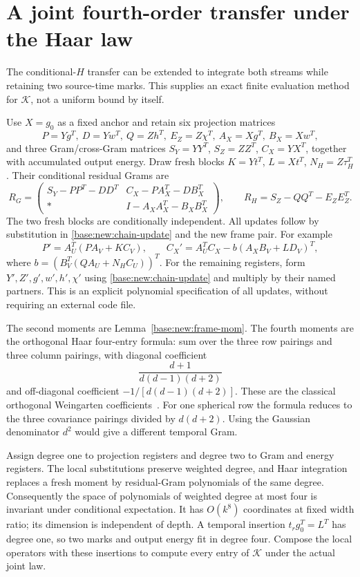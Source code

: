 \documentclass[11pt,oneside,openany,a4paper]{book}
\numberwithin{equation}{chapter}
\theoremstyle{definition}
\theoremstyle{remark}
\begin{document}
\section{A joint fourth-order transfer under the Haar law}\label{base:new:fourth}
The conditional-$H$ transfer can be extended to integrate both streams while retaining two source-time marks. This supplies an exact finite evaluation method for $\mathcal K$, not a uniform bound by itself.

Use $X=g_0$ as a fixed anchor and retain six projection matrices
\[
 P=Yg^T,\ D=Yw^T,\ Q=Zh^T,\ E_Z=Z\chi^T,
 \ A_X=Xg^T,\ B_X=Xw^T,
\]
and three Gram/cross-Gram matrices $S_Y=YY^T$, $S_Z=ZZ^T$, $C_X=YX^T$, together with accumulated output energy. Draw fresh blocks $K=Yt^T$, $L=Xt^T$, $N_H=Z\tau_H^T$. Their conditional residual Grams are
\[
 R_G=\begin{pmatrix}
 S_Y-PP^T-DD^T&C_X-PA_X^T-DB_X^T\\
 *&I-A_XA_X^T-B_XB_X^T
 \end{pmatrix},\qquad
 R_H=S_Z-QQ^T-E_ZE_Z^T.
\]
The two fresh blocks are conditionally independent. All updates follow by substitution in \eqref{base:new:chain-update} and the new frame pair. For example
\[
 P'=A_U^T(PA_V+KC_V),\qquad
 C_X'=A_U^TC_X-b(A_XB_V+LD_V)^T,
\]
where $b=(B_V^T(QA_U+N_HC_U))^T$. For the remaining registers, form $Y',Z',g',w',h',\chi'$ using \eqref{base:new:chain-update} and multiply by their named partners. This is an explicit polynomial specification of all updates, without requiring an external code file.

The second moments are Lemma~\ref{base:new:frame-mom}. The fourth moments are the orthogonal Haar four-entry formula: sum over the three row pairings and three column pairings, with diagonal coefficient
\[
 \frac{d+1}{d(d-1)(d+2)}
\]
and off-diagonal coefficient $-1/[d(d-1)(d+2)]$. These are the classical orthogonal Weingarten coefficients~\cite{CS}. For one spherical row the formula reduces to the three covariance pairings divided by $d(d+2)$. Using the Gaussian denominator $d^2$ would give a different temporal Gram.

Assign degree one to projection registers and degree two to Gram and energy registers. The local substitutions preserve weighted degree, and Haar integration replaces a fresh moment by residual-Gram polynomials of the same degree. Consequently the space of polynomials of weighted degree at most four is invariant under conditional expectation. It has $O(k^8)$ coordinates at fixed width ratio; its dimension is independent of depth. A temporal insertion $t_rg_0^T=L^T$ has degree one, so two marks and output energy fit in degree four. Compose the local operators with these insertions to compute every entry of $\mathcal K$ under the actual joint law.
\end{document}
